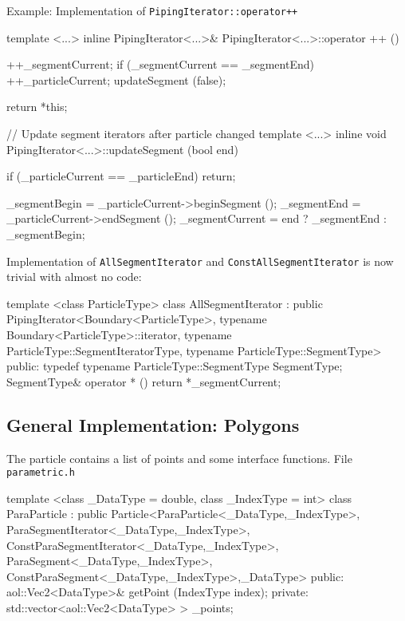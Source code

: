 Example: Implementation of \lstinline$PipingIterator::operator++$

\begin{myverbatim}
  template <...>
    inline PipingIterator<...>& PipingIterator<...>::operator ++ ()
    {
      ++_segmentCurrent;
      if (_segmentCurrent == _segmentEnd) {
        ++_particleCurrent;
        updateSegment (false);
      }

      return *this;
    }
\end{myverbatim}



\begin{myverbatim}
  // Update segment iterators after particle changed
  template <...>
    inline void PipingIterator<...>::updateSegment (bool end)
    {
      if (_particleCurrent == _particleEnd) return;

      _segmentBegin = _particleCurrent->beginSegment ();
      _segmentEnd = _particleCurrent->endSegment ();
      _segmentCurrent = end ? _segmentEnd : _segmentBegin;
    }
\end{myverbatim}



Implementation of \lstinline$AllSegmentIterator$ and \lstinline$ConstAllSegmentIterator$
is now trivial with almost no code:

\begin{myverbatim}
template <class ParticleType>
  class AllSegmentIterator
  : public PipingIterator<Boundary<ParticleType>,
   typename Boundary<ParticleType>::iterator,
   typename ParticleType::SegmentIteratorType,
   typename ParticleType::SegmentType> {
  public:
    typedef typename ParticleType::SegmentType SegmentType;
    SegmentType& operator * () {
      return *_segmentCurrent;
    }
}
\end{myverbatim}

\subsection {General Implementation: Polygons}

The particle contains a list of points and
some interface functions. File \lstinline$parametric.h$

\begin{myverbatim}
template <class _DataType = double, class _IndexType = int>
  class ParaParticle
  : public Particle<ParaParticle<_DataType,_IndexType>,
   ParaSegmentIterator<_DataType,_IndexType>,
   ConstParaSegmentIterator<_DataType,_IndexType>,
   ParaSegment<_DataType,_IndexType>,
   ConstParaSegment<_DataType,_IndexType>,_DataType> {
   public:
     aol::Vec2<DataType>& getPoint (IndexType index);
   private:
     std::vector<aol::Vec2<DataType> > _points;
}
\end{myverbatim}



